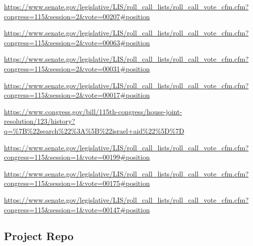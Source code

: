 \documentclass[11pt,twocolumn]{article}
\begin{document}
	\url{https://www.senate.gov/legislative/LIS/roll_call_lists/roll_call_vote_cfm.cfm?congress=115&session=2&vote=00207#position}
	
	\url{https://www.senate.gov/legislative/LIS/roll_call_lists/roll_call_vote_cfm.cfm?congress=115&session=2&vote=00063#position}
	
	\url{https://www.senate.gov/legislative/LIS/roll_call_lists/roll_call_vote_cfm.cfm?congress=115&session=2&vote=00031#position}
	
	\url{https://www.senate.gov/legislative/LIS/roll_call_lists/roll_call_vote_cfm.cfm?congress=115&session=2&vote=00017#position}
	
	\url{https://www.congress.gov/bill/115th-congress/house-joint-resolution/123/history?q=%7B%22search%22%3A%5B%22israel+aid%22%5D%7D}
	
	\url{https://www.senate.gov/legislative/LIS/roll_call_lists/roll_call_vote_cfm.cfm?congress=115&session=1&vote=00199#position}

	\url{https://www.senate.gov/legislative/LIS/roll_call_lists/roll_call_vote_cfm.cfm?congress=115&session=1&vote=00175#position}
	
	\url{https://www.senate.gov/legislative/LIS/roll_call_lists/roll_call_vote_cfm.cfm?congress=115&session=1&vote=00147#position}
	
	\subsection{Project Repo}


\end{document}
